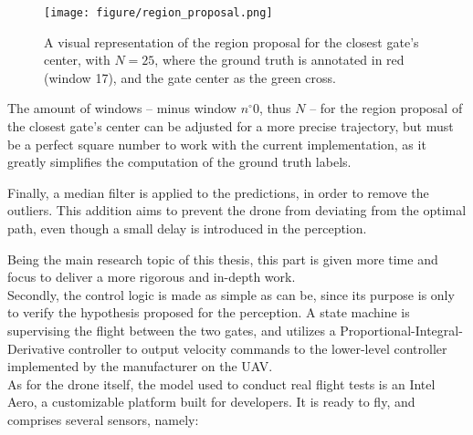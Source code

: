 \begin{figure}[h!]
	\center
	\texttt{[image: figure/region\_proposal.png]}
	\caption[Visual representation of the region proposal grid]{A visual
		representation of the region proposal for the closest gate's center, with
		$N=25$, where the ground truth is annotated in red (window 17), and the gate
		center as the green cross.}
	\label{fig:regionproposal}
\end{figure}

The amount of windows -- minus window $n^{\circ}0$, thus $N$ -- for the region
proposal of the closest gate's center can be adjusted for a more precise
trajectory, but must be a perfect square number to work with the current
implementation, as it greatly simplifies the computation of the ground truth
labels.

Finally, a median filter is applied to the predictions, in order to remove the
outliers. This addition aims to prevent the drone from deviating from the
optimal path, even though a small delay is introduced in the perception.

Being the main research topic of this thesis, this part is given more time and
focus to deliver a more rigorous and in-depth work.\\


Secondly, the control logic is made as simple as can be, since its purpose is
only to verify the hypothesis proposed for the perception. A state machine is
supervising the flight between the two gates, and utilizes a
Proportional-Integral-Derivative controller to output velocity commands to the
lower-level controller implemented by the manufacturer on the UAV.\\


As for the drone itself, the model used to conduct real flight tests is an Intel
Aero, a customizable platform built for developers. It is ready to fly, and
comprises several sensors, namely:

